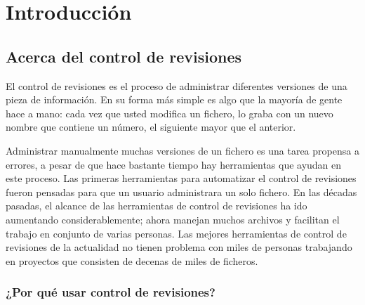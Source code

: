 \chapter{Introducción}
\label{chap:intro}

\section{Acerca del control de revisiones}

El control de revisiones es el proceso de administrar diferentes
versiones de una pieza de información. En su forma más simple es algo
que la mayoría de gente hace a mano: cada vez que usted modifica un
fichero, lo graba con un nuevo nombre que contiene un número, el
siguiente mayor que el anterior.

Administrar manualmente muchas versiones de un fichero es una tarea
propensa a errores, a pesar de que hace bastante tiempo hay
herramientas que ayudan en este proceso.  Las primeras herramientas
para automatizar el control de revisiones fueron pensadas para que un
usuario administrara un solo fichero.  En las décadas pasadas, el
alcance de las herramientas de control de revisiones ha ido aumentando
considerablemente; ahora manejan muchos archivos y facilitan el
trabajo en conjunto de varias personas. Las mejores herramientas de
control de revisiones de la actualidad no tienen problema con miles de
personas trabajando en proyectos que consisten de decenas de miles de
ficheros.

\subsection{¿Por qué usar control de revisiones?}

